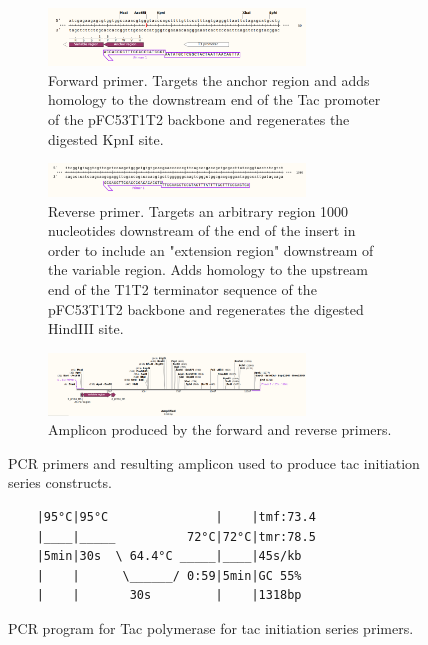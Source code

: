 \documentclass[11pt]{article}
\begin{document}
\begin{figure}[H]
	\centering
	\begin{subfigure}[b]{\textwidth}
		\centering
		\includegraphics[width=0.75\textwidth]{images/primers/t7-init-forward.png}
		\caption{Forward primer. Targets the anchor region and adds homology to the downstream end of the Tac promoter of the pFC53T1T2 backbone and regenerates the digested KpnI site.}
		\label{fig:y equals x}
	\end{subfigure}
	\vfill
	\begin{subfigure}[b]{\textwidth}
		\centering
		\includegraphics[width=0.75\textwidth]{images/primers/t7-init-reverse.png}
		\caption{Reverse primer. Targets an arbitrary region 1000 nucleotides downstream of the end of the insert in order to include an "extension region" downstream of the variable region. Adds homology to the upstream end of the T1T2 terminator sequence of the pFC53T1T2 backbone and regenerates the digested HindIII site.}
		\label{fig:three sin x}
	\end{subfigure}
	\vfill
	\begin{subfigure}[b]{\textwidth}
		\centering
		\includegraphics[width=0.75\textwidth]{images/primers/t7-init-amplicon.png}
		\caption{Amplicon produced by the forward and reverse primers.}
		\label{fig:three sin x}
	\end{subfigure}
	\caption{PCR primers and resulting amplicon used to produce tac initiation series constructs.}
\end{figure}


\begin{figure}[H]
	\centering
	\begin{BVerbatim}
	|95°C|95°C               |    |tmf:73.4
	|____|_____          72°C|72°C|tmr:78.5
	|5min|30s  \ 64.4°C _____|____|45s/kb
	|    |      \______/ 0:59|5min|GC 55%
	|    |       30s         |    |1318bp
	\end{BVerbatim}
	\caption{PCR program for Tac polymerase for tac initiation series primers.}
\end{figure}
\end{document}
